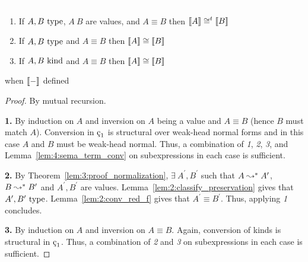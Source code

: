 \begin{lemma}
    \label{lem:4:sema_type_conv}
    \textcolor{white}{\_}
    \begin{enumerate}
        \item If $A, B~\textnormal{type}$, $A\ B$ are values, and $A \equiv B$ then $\llbracket A \rrbracket \cong^t \llbracket B \rrbracket$
        \item If $A, B~\textnormal{type}$ and $A \equiv B$ then $\llbracket A \rrbracket \cong \llbracket B \rrbracket$
        \item If $A, B~\textnormal{kind}$ and $A \equiv B$ then $\llbracket A \rrbracket \cong \llbracket B \rrbracket$
    \end{enumerate}
    when $\llbracket - \rrbracket$ defined
\end{lemma}
\begin{proof}
    By mutual recursion.

    \noindent \textbf{1.}
    By induction on $A$ and inversion on $A$ being a value and $A \equiv B$ (hence $B$ must match $A$).
    Conversion in $\oldced$ is structural over weak-head normal forms and in this case $A$ and $B$ must be weak-head normal.
    Thus, a combination of \textit{1}, \textit{2}, \textit{3}, and Lemma~\ref{lem:4:sema_term_conv} on subexpressions in each case is sufficient.

    \noindent \textbf{2.}
    By Theorem~\ref{lem:3:proof_normalization}, $\exists\ A^\prime, B^\prime$ such that $A \leadsto^* A^\prime$, $B \leadsto^* B^\prime$ and $A^\prime, B^\prime$ are values.
    Lemma~\ref{lem:2:classify_preservation} gives that $A^\prime, B^\prime~\textnormal{type}$.
    Lemma~\ref{lem:2:conv_red_f} gives that $A^\prime \equiv B^\prime$.
    Thus, applying \textit{1} concludes.

    \noindent \textbf{3.}
    By induction on $A$ and inversion on $A \equiv B$.
    Again, conversion of kinds is structural in $\oldced$.
    Thus, a combination of \textit{2} and \textit{3} on subexpressions in each case is sufficient.
\end{proof}

